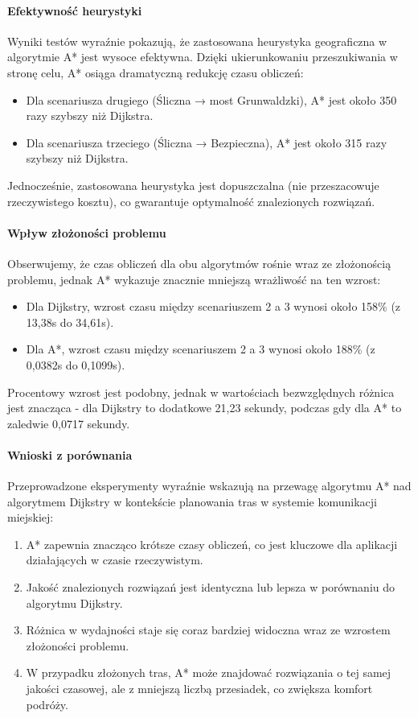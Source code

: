 \documentclass[12pt,a4paper]{article}
\begin{document}
\paragraph{Efektywność heurystyki}
Wyniki testów wyraźnie pokazują, że zastosowana heurystyka geograficzna w algorytmie A* jest wysoce efektywna. Dzięki ukierunkowaniu przeszukiwania w stronę celu, A* osiąga dramatyczną redukcję czasu obliczeń:

\begin{itemize}
    \item Dla scenariusza drugiego (Śliczna → most Grunwaldzki), A* jest około 350 razy szybszy niż Dijkstra.
    \item Dla scenariusza trzeciego (Śliczna → Bezpieczna), A* jest około 315 razy szybszy niż Dijkstra.
\end{itemize}

Jednocześnie, zastosowana heurystyka jest dopuszczalna (nie przeszacowuje rzeczywistego kosztu), co gwarantuje optymalność znalezionych rozwiązań.

\paragraph{Wpływ złożoności problemu}
Obserwujemy, że czas obliczeń dla obu algorytmów rośnie wraz ze złożonością problemu, jednak A* wykazuje znacznie mniejszą wrażliwość na ten wzrost:

\begin{itemize}
    \item Dla Dijkstry, wzrost czasu między scenariuszem 2 a 3 wynosi około 158\% (z 13,38s do 34,61s).
    \item Dla A*, wzrost czasu między scenariuszem 2 a 3 wynosi około 188\% (z 0,0382s do 0,1099s).
\end{itemize}

Procentowy wzrost jest podobny, jednak w wartościach bezwzględnych różnica jest znacząca - dla Dijkstry to dodatkowe 21,23 sekundy, podczas gdy dla A* to zaledwie 0,0717 sekundy.

\paragraph{Wnioski z porównania}
Przeprowadzone eksperymenty wyraźnie wskazują na przewagę algorytmu A* nad algorytmem Dijkstry w kontekście planowania tras w systemie komunikacji miejskiej:

\begin{enumerate}
    \item A* zapewnia znacząco krótsze czasy obliczeń, co jest kluczowe dla aplikacji działających w czasie rzeczywistym.
    \item Jakość znalezionych rozwiązań jest identyczna lub lepsza w porównaniu do algorytmu Dijkstry.
    \item Różnica w wydajności staje się coraz bardziej widoczna wraz ze wzrostem złożoności problemu.
    \item W przypadku złożonych tras, A* może znajdować rozwiązania o tej samej jakości czasowej, ale z mniejszą liczbą przesiadek, co zwiększa komfort podróży.
\end{enumerate}
\end{document}
